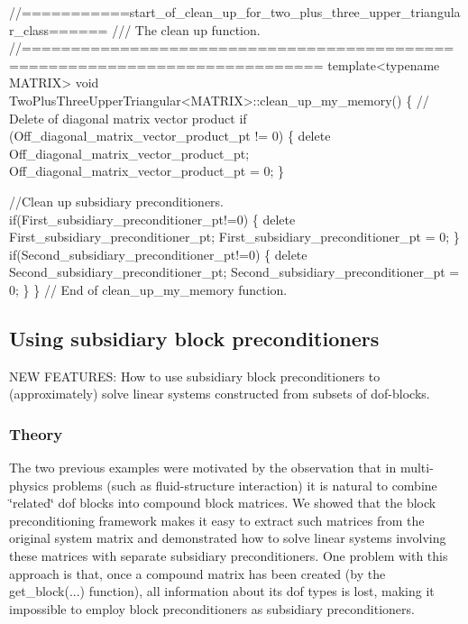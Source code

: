 \begin{DoxyCodeInclude}
 \textcolor{comment}{//===========start\_of\_clean\_up\_for\_two\_plus\_three\_upper\_triangular\_class======}\textcolor{comment}{}
\textcolor{comment}{ /// The clean up function.}
\textcolor{comment}{} \textcolor{comment}{//============================================================================}
 \textcolor{keyword}{template}<\textcolor{keyword}{typename} MATRIX> 
 \textcolor{keywordtype}{void} TwoPlusThreeUpperTriangular<MATRIX>::clean\_up\_my\_memory()
 \{     
  \textcolor{comment}{// Delete of diagonal matrix vector product}
  \textcolor{keywordflow}{if} (Off\_diagonal\_matrix\_vector\_product\_pt != 0)
   \{
    \textcolor{keyword}{delete} Off\_diagonal\_matrix\_vector\_product\_pt;
    Off\_diagonal\_matrix\_vector\_product\_pt = 0;
   \}

  \textcolor{comment}{//Clean up subsidiary preconditioners.}
  \textcolor{keywordflow}{if}(First\_subsidiary\_preconditioner\_pt!=0)
   \{
    \textcolor{keyword}{delete} First\_subsidiary\_preconditioner\_pt;
    First\_subsidiary\_preconditioner\_pt = 0;
   \}
  \textcolor{keywordflow}{if}(Second\_subsidiary\_preconditioner\_pt!=0)
   \{
    \textcolor{keyword}{delete} Second\_subsidiary\_preconditioner\_pt;
    Second\_subsidiary\_preconditioner\_pt = 0;
   \}
 \} \textcolor{comment}{// End of clean\_up\_my\_memory function.}

\end{DoxyCodeInclude}




 

\hypertarget{index_two_plus_three_upper_triangular_with_sub}{}\subsection{Using subsidiary block preconditioners}\label{index_two_plus_three_upper_triangular_with_sub}
N\+EW F\+E\+A\+T\+U\+R\+ES\+: How to use subsidiary block preconditioners to (approximately) solve linear systems constructed from subsets of dof-\/blocks.\hypertarget{index_two_plus_three_upper_triangular_with_sub_theory}{}\subsubsection{Theory}\label{index_two_plus_three_upper_triangular_with_sub_theory}
The two previous examples were motivated by the observation that in multi-\/physics problems (such as fluid-\/structure interaction) it is natural to combine \char`\"{}related\char`\"{} dof blocks into compound block matrices. We showed that the block preconditioning framework makes it easy to extract such matrices from the original system matrix and demonstrated how to solve linear systems involving these matrices with separate subsidiary preconditioners. One problem with this approach is that, once a compound matrix has been created (by the {\ttfamily get\+\_\+block}(...) function), all information about its dof types is lost, making it impossible to employ block preconditioners as subsidiary preconditioners.

